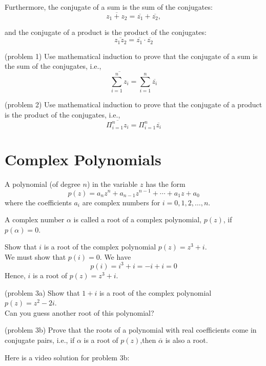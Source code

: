 \documentclass[handout]{ximera}
\begin{document}
Furthermore, the conjugate of a sum is the sum of the conjugates:
\[
\overline{z_1 + z_2} = \overline{z_1} + \overline{z_2},
\]

and the conjugate of a product is the product of the conjugates:
\[
\overline{z_1 z_2} = \overline{z_1} \cdot \overline{z_2}
\]



\begin{problem}(problem 1) Use mathematical induction to prove that the conjugate of a sum is the sum of the conjugates, i.e.,
\[
\overline{\sum_{i=1}^n z_i} =  \sum_{i=1}^n \overline{z_i}
\]

\end{problem}

\begin{problem}(problem 2) Use mathematical induction to prove that the conjugate of a product is the product of the conjugates, i.e.,
\[
\overline{\Pi_{i=1}^n z_i} =  \Pi_{i=1}^n \overline{z_i}
\]

\end{problem}

\section{Complex Polynomials}

A polynomial (of degree $n$) in the variable $z$ has the form
\[
p(z) = a_n z^n + a_{n-1}z^{n-1} + \cdots + a_1 z + a_0
\]
where the coefficients $a_i$ are complex numbers for $i = 0, 1, 2, \dots, n$.

A complex number $\alpha$ is called a root of a complex polynomial, $p(z)$, if $p(\alpha) = 0$.

\begin{example}
Show that $i$ is a root of the complex polynomial $p(z) = z^3 + i$.\\
We must show that $p(i) = 0$. We have
\[
p(i) = i^3 + i = -i +i = 0
\]
Hence, $i$ is a root of $p(z) = z^3 + i$.
\end{example}

\begin{problem}(problem 3a)
Show that $1+i$ is a root of the complex polynomial $p(z) = z^2 - 2i$.\\
Can you guess another root of this polynomial?
\end{problem}

\begin{problem}(problem 3b) Prove that the roots of a polynomial with real coefficients 
come in conjugate pairs, i.e., if $\alpha$ is a root of $p(z)$,then 
$\overline{\alpha}$ is also a root.
\end{problem}


Here is a video solution for problem 3b:\\
\begin{foldable}
\end{foldable}
\end{document}
